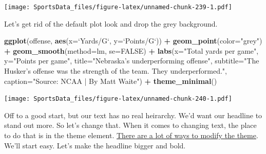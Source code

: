 \documentclass[]{book}
\newenvironment{Shaded}{\begin{snugshade}}{\end{snugshade}}
\newcommand{\KeywordTok}[1]{\textcolor[rgb]{0.13,0.29,0.53}{\textbf{#1}}}
\newcommand{\DataTypeTok}[1]{\textcolor[rgb]{0.13,0.29,0.53}{#1}}
\newcommand{\StringTok}[1]{\textcolor[rgb]{0.31,0.60,0.02}{#1}}
\newcommand{\OtherTok}[1]{\textcolor[rgb]{0.56,0.35,0.01}{#1}}
\newcommand{\OperatorTok}[1]{\textcolor[rgb]{0.81,0.36,0.00}{\textbf{#1}}}
\newcommand{\NormalTok}[1]{#1}
\begin{document}
\texttt{[image: SportsData\_files/figure-latex/unnamed-chunk-239-1.pdf]}

Let's get rid of the default plot look and drop the grey background.

\begin{Shaded}
\begin{Highlighting}[]
\KeywordTok{ggplot}\NormalTok{(offense, }\KeywordTok{aes}\NormalTok{(}\DataTypeTok{x=}\StringTok{`}\DataTypeTok{Yards/G}\StringTok{`}\NormalTok{, }\DataTypeTok{y=}\StringTok{`}\DataTypeTok{Points/G}\StringTok{`}\NormalTok{)) }\OperatorTok{+}\StringTok{ }
\StringTok{  }\KeywordTok{geom_point}\NormalTok{(}\DataTypeTok{color=}\StringTok{"grey"}\NormalTok{) }\OperatorTok{+}\StringTok{ }\KeywordTok{geom_smooth}\NormalTok{(}\DataTypeTok{method=}\NormalTok{lm, }\DataTypeTok{se=}\OtherTok{FALSE}\NormalTok{) }\OperatorTok{+}\StringTok{ }
\StringTok{  }\KeywordTok{labs}\NormalTok{(}\DataTypeTok{x=}\StringTok{"Total yards per game"}\NormalTok{, }\DataTypeTok{y=}\StringTok{"Points per game"}\NormalTok{, }\DataTypeTok{title=}\StringTok{"Nebraska's underperforming offense"}\NormalTok{, }\DataTypeTok{subtitle=}\StringTok{"The Husker's offense was the strength of the team. They underperformed."}\NormalTok{, }\DataTypeTok{caption=}\StringTok{"Source: NCAA | By Matt Waite"}\NormalTok{) }\OperatorTok{+}\StringTok{ }
\StringTok{  }\KeywordTok{theme_minimal}\NormalTok{()}
\end{Highlighting}
\end{Shaded}

\texttt{[image: SportsData\_files/figure-latex/unnamed-chunk-240-1.pdf]}

Off to a good start, but our text has no real heirarchy. We'd want our
headline to stand out more. So let's change that. When it comes to
changing text, the place to do that is in the theme element.
\href{http://ggplot2.tidyverse.org/reference/theme.html}{There are a lot
of ways to modify the theme}. We'll start easy. Let's make the headline
bigger and bold.
\end{document}
